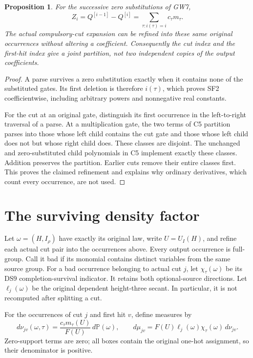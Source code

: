 \documentclass[11pt]{article}
\newtheorem{proposition}{Proposition}
\newcommand{\Prb}{\mathbb P}
\begin{document}
\begin{proposition}
For the successive zero substitutions of GW7,
\[
 Z_i=Q^{[i-1]}-Q^{[i]}
       =\sum_{\tau:i(\tau)=i}c_\tau m_\tau.          \tag{SF2}
\]
The actual compulsory-cut expansion can be refined into these same
original occurrences without altering a coefficient. Consequently
the cut index and the first-hit index give a joint partition, not
two independent copies of the output coefficients.
\end{proposition}
\begin{proof}
A parse survives a zero substitution exactly when it contains none
of the substituted gates. Its first deletion is therefore $i(\tau)$,
which proves SF2 coefficientwise, including arbitrary powers and
nonnegative real constants.

For the cut at an original gate, distinguish its first occurrence
in the left-to-right traversal of a parse. At a multiplication gate,
the two terms of C5 partition parses into those whose left child
contains the cut gate and those whose left child does not but whose
right child does. These classes are disjoint. The unchanged and
zero-substituted child polynomials in C5 implement exactly these
classes. Addition preserves the partition. Earlier cuts remove
their entire classes first. This proves the claimed refinement
and explains why ordinary derivatives, which count every occurrence,
are not used.
\end{proof}

\section{The surviving density factor}
Let $\omega=(H,I_\rho)$ have exactly its original law, write
$U=U_I(H)$, and refine each actual cut pair into the occurrences
above. Every output occurrence is full-group. Call it bad if its
monomial contains distinct variables from the same source group.
For a bad occurrence belonging to actual cut $j$, let
$\chi_\tau(\omega)$ be its DS9 completion-survival indicator.
It retains both optional-source directions.
Let $\ell_j(\omega)$ be the original dependent height-three secant.
In particular, it is not recomputed after splitting a cut.

For the occurrences of cut $j$ and first hit $v$, define measures by
\[
 d\nu_{jv}(\omega,\tau)=
  \frac{c_\tau m_\tau(U)}{F(U)}\,d\Prb(\omega),\qquad
 d\mu_{jv}=F(U)\ell_j(\omega)\chi_\tau(\omega)\,d\nu_{jv}.
                                                               \tag{SF3}
\]
Zero-support terms are zero; all boxes contain the original one-hot
assignment, so their denominator is positive.
\end{document}
